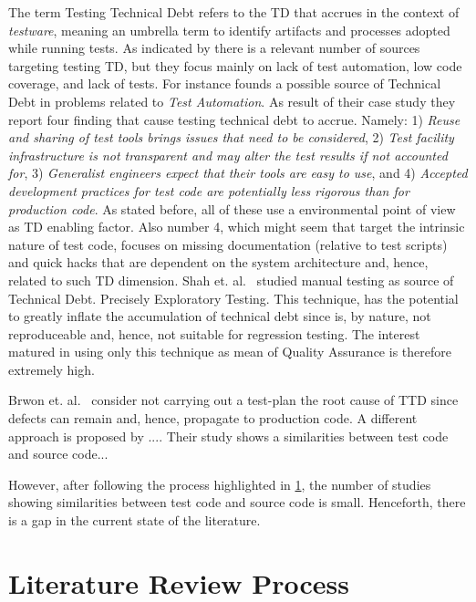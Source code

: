 The term Testing Technical Debt refers to the TD that accrues in the context of \textit{testware}, meaning an umbrella term to identify artifacts and processes adopted while running tests. As indicated by \cite{mapping_study_td} there is a relevant number of sources targeting testing TD, but they focus mainly on lack of test automation, low code coverage, and lack of tests.  For instance \cite{test_automation_td} founds a possible source of Technical Debt in problems related to \textit{Test Automation}. As result of their case study they report four finding that cause testing technical debt to accrue. Namely: 1) \textit{Reuse and sharing of test tools brings issues that need to be considered}, 2) \textit{Test facility infrastructure is not transparent and may alter the test results if not accounted for}, 3) \textit{Generalist engineers expect that their tools are easy to use}, and 4) \textit{Accepted development practices for test code are potentially less rigorous than for production code}. As stated before, all of these use a environmental point of view as TD enabling factor. Also number 4, which might seem that target the intrinsic nature of test code, focuses on missing documentation (relative to test scripts) and quick hacks that are dependent on the system architecture and, hence, related to such TD dimension. Shah et. al.\ \cite{exploratorying_testing_td} studied manual testing as source of Technical Debt. Precisely Exploratory Testing. This technique, has the potential to greatly inflate the accumulation of technical debt since is, by nature, not reproduceable and, hence, not suitable for regression testing. The interest matured in using only this technique as mean of Quality Assurance is therefore extremely high.

Brwon et. al.\ \cite{td_current_vs_optimal_quality} consider not carrying out a test-plan the root cause of TTD since defects can remain and, hence, propagate to production code. 
A different approach is proposed by .... Their study shows a similarities between test code and source code...

However, after following the process highlighted in \ref{literature_review_process}, the number of studies showing similarities between test code and source code is small. Henceforth, there is a gap in the current state of the literature.

\section{Literature Review Process} \label{literature_review_process}